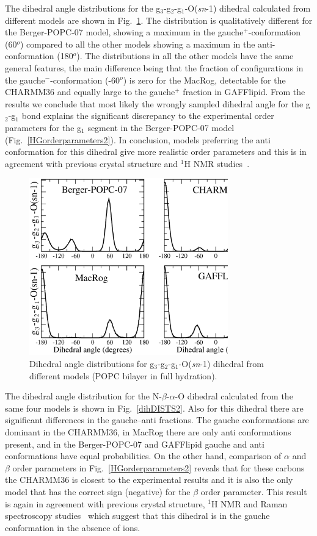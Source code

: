 \documentclass[journal=jacsat,manuscript=article]{achemso}
\begin{document}
The dihedral angle distributions for the  g$_3$-g$_2$-g$_1$-O(\textit{sn}-1) dihedral calculated from different models are
shown in Fig.~\ref{dihDISTS}. The distribution is qualitatively different for the Berger-POPC-07 model, showing a maximum in 
the gauche$^+$-conformation (60$^o$) compared to all the other models showing a maximum in the anti-conformation (180$^o$).
The distributions in all the other models have the same general features, the main difference being that the
fraction of configurations in the gauche$^-$-conformation (-60$^o$) is zero for the MacRog, detectable for the CHARMM36 and
equally large to the gauche$^+$ fraction in GAFFlipid. From the results we conclude that most likely the wrongly sampled
dihedral angle for the g$_2$-g$_1$ bond explains the significant discrepancy to the experimental order parameters
for the g$_1$ segment in the Berger-POPC-07 model (Fig.~\ref{HGorderparameters2}). 
In conclusion, models preferring the anti conformation for this dihedral give more realistic order parameters and
this is in agreement with previous crystal structure and $^1$H NMR studies~\cite{hauser80,hauser81,hauser81b,hauser88,pascher92,marsh06}.
\begin{figure}[]
  \centering
  \includegraphics[width=8.6cm]{../Fig/g1-g2_Cdihs2.eps}
  \caption{\label{dihDISTS}
    Dihedral angle distributions for g$_3$-g$_2$-g$_1$-O(\textit{sn}-1) dihedral from different models (POPC bilayer in full hydration).
      } 
\end{figure}

The dihedral angle distribution for the  N-$\beta$-$\alpha$-O dihedral calculated from the same four models is 
shown in Fig.~\ref{dihDISTS2}. Also for this dihedral there are significant differences in the gauche--anti fractions.
The gauche conformations are dominant in the CHARMM36, in MacRog there are only anti conformations present,
and in the Berger-POPC-07 and GAFFlipid gauche and anti conformations have equal probabilities. 
On the other hand, comparison of $\alpha$ and $\beta$ order parameters in Fig.~\ref{HGorderparameters2}
reveals that for these carbons the CHARMM36 is closest to the experimental results and it is also the only model that has the correct
sign (negative) for the $\beta$ order parameter. This result is again in agreement with previous 
crystal structure, $^1$H NMR and Raman spectroscopy studies~\cite{hauser80,hauser81,hauser81b,akutsu81b} which suggest that
this dihedral is in the gauche conformation in the absence of ions.
\end{document}
